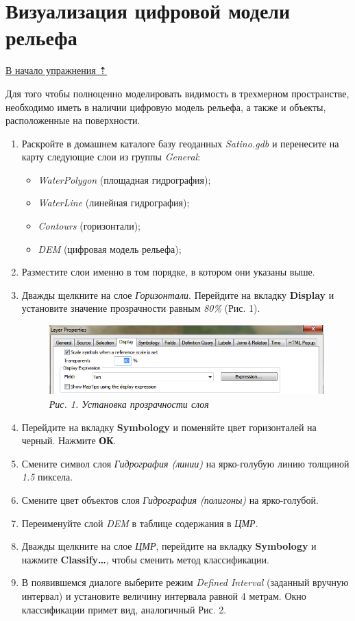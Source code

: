 \documentclass[12pt,]{book}
\providecommand{\tightlist}{%
  \setlength{\itemsep}{0pt}\setlength{\parskip}{0pt}}
\begin{document}
\hypertarget{threed-modelling-demviz}{%
\section{Визуализация цифровой модели рельефа}\label{threed-modelling-demviz}}

\protect\hyperlink{threed-modelling}{В начало упражнения ⇡}

Для того чтобы полноценно моделировать видимость в трехмерном пространстве, необходимо иметь в наличии цифровую модель рельефа, а также и объекты, расположенные на поверхности.

\begin{enumerate}
\def\labelenumi{\arabic{enumi}.}
\item
  Раскройте в домашнем каталоге базу геоданных \emph{Satino.gdb} и перенесите на карту следующие слои из группы \emph{General}:

  \begin{itemize}
  \tightlist
  \item
    \emph{WaterPolygon} (площадная гидрография);
  \item
    \emph{WaterLine} (линейная гидрография);
  \item
    \emph{Contours} (горизонтали);
  \item
    \emph{DEM} (цифровая модель рельефа);
  \end{itemize}
\item
  Разместите слои именно в том порядке, в котором они указаны выше.
\item
  Дважды щелкните на слое \emph{Горизонтали}. Перейдите на вкладку \textbf{Display} и установите значение прозрачности равным \emph{80\%} (Рис. 1).

  \begin{figure}
  \centering
  \includegraphics{images/Ex18/image2.png}
  \caption{\emph{Рис. 1. Установка прозрачности слоя}}
  \end{figure}
\item
  Перейдите на вкладку \textbf{Symbology} и поменяйте цвет горизонталей на черный. Нажмите \textbf{ОК}.
\item
  Смените символ слоя \emph{Гидрография (линии)} на ярко-голубую линию толщиной \emph{1.5} пиксела.
\item
  Смените цвет объектов слоя \emph{Гидрография (полигоны)} на ярко-голубой.
\item
  Переименуйте слой \emph{DEM} в таблице содержания в \emph{ЦМР}.
\item
  Дважды щелкните на слое \emph{ЦМР}, перейдите на вкладку \textbf{Symbology} и нажмите \textbf{Classify\ldots{}}, чтобы сменить метод классификации.
\item
  В появившемся диалоге выберите режим \emph{Defined Interval} (заданный вручную интервал) и установите величину интервала равной 4 метрам. Окно классификации примет вид, аналогичный Рис. 2.


\end{enumerate}
\end{document}
